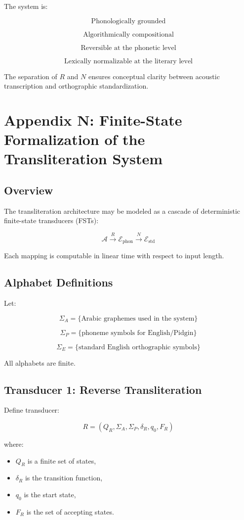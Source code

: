 \documentclass[12pt]{article}
\begin{document}
The system is:

\[
\text{Phonologically grounded}
\]

\[
\text{Algorithmically compositional}
\]

\[
\text{Reversible at the phonetic level}
\]

\[
\text{Lexically normalizable at the literary level}
\]

The separation of $R$ and $N$ ensures conceptual clarity between acoustic transcription and orthographic standardization.

\section{Appendix N: Finite-State Formalization of the Transliteration System}

\subsection{Overview}

The transliteration architecture may be modeled as a cascade of deterministic finite-state transducers (FSTs):

\[
\mathcal{A} \xrightarrow{R} \mathcal{E}_{\text{phon}} \xrightarrow{N} \mathcal{E}_{\text{std}}
\]

Each mapping is computable in linear time with respect to input length.

\subsection{Alphabet Definitions}

Let:

\[
\Sigma_A = \{\text{Arabic graphemes used in the system}\}
\]

\[
\Sigma_P = \{\text{phoneme symbols for English/Pidgin}\}
\]

\[
\Sigma_E = \{\text{standard English orthographic symbols}\}
\]

All alphabets are finite.

\subsection{Transducer 1: Reverse Transliteration}

Define transducer:

\[
R = (Q_R, \Sigma_A, \Sigma_P, \delta_R, q_0, F_R)
\]

where:

\begin{itemize}
\item $Q_R$ is a finite set of states,
\item $\delta_R$ is the transition function,
\item $q_0$ is the start state,
\item $F_R$ is the set of accepting states.
\end{itemize}
\end{document}

